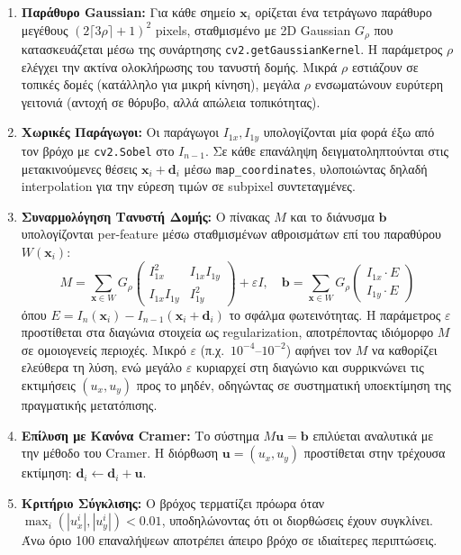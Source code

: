 \documentclass[12pt]{article}
\begin{document}
\begin{enumerate}
    \item \textbf{Παράθυρο Gaussian:} Για κάθε σημείο $\mathbf{x}_i$ ορίζεται ένα τετράγωνο παράθυρο μεγέθους $(2\lceil 3\rho \rceil + 1)^2$ pixels, σταθμισμένο με 2D Gaussian $G_\rho$ που κατασκευάζεται μέσω της συνάρτησης \texttt{cv2.getGaussianKernel}. Η παράμετρος $\rho$ ελέγχει την ακτίνα ολοκλήρωσης του τανυστή δομής. Μικρά $\rho$ εστιάζουν σε τοπικές δομές (κατάλληλο για μικρή κίνηση), μεγάλα $\rho$ ενσωματώνουν ευρύτερη γειτονιά (αντοχή σε θόρυβο, αλλά απώλεια τοπικότητας).

    \item \textbf{Χωρικές Παράγωγοι:} Οι παράγωγοι $I_{1x}, I_{1y}$ υπολογίζονται μία φορά έξω από τον βρόχο με \texttt{cv2.Sobel} στο $I_{n-1}$. Σε κάθε επανάληψη δειγματοληπτούνται στις μετακινούμενες θέσεις $\mathbf{x}_i + \mathbf{d}_i$ μέσω \texttt{map\_coordinates}, υλοποιώντας δηλαδή interpolation για την εύρεση τιμών σε subpixel συντεταγμένες.

    \item \textbf{Συναρμολόγηση Τανυστή Δομής:} Ο πίνακας $M$ και το διάνυσμα $\mathbf{b}$ υπολογίζονται per-feature μέσω σταθμισμένων αθροισμάτων επί του παραθύρου $W(\mathbf{x}_i)$:
    \[
    M = \sum_{\mathbf{x} \in W} G_\rho \begin{pmatrix} I_{1x}^2 & I_{1x}I_{1y} \\ I_{1x}I_{1y} & I_{1y}^2 \end{pmatrix} + \varepsilon I, \quad
    \mathbf{b} = \sum_{\mathbf{x} \in W} G_\rho \begin{pmatrix} I_{1x} \cdot E \\ I_{1y} \cdot E \end{pmatrix}
    \]
    όπου $E = I_n(\mathbf{x}_i) - I_{n-1}(\mathbf{x}_i + \mathbf{d}_i)$ το σφάλμα φωτεινότητας. Η παράμετρος $\varepsilon$ προστίθεται στα διαγώνια στοιχεία ως regularization, αποτρέποντας ιδιόμορφο $M$ σε ομοιογενείς περιοχές. Μικρό $\varepsilon$ (π.χ.\ $10^{-4}$--$10^{-2}$) αφήνει τον $M$ να καθορίζει ελεύθερα τη λύση, ενώ μεγάλο $\varepsilon$ κυριαρχεί στη διαγώνιο και συρρικνώνει τις εκτιμήσεις $(u_x, u_y)$ προς το μηδέν, οδηγώντας σε συστηματική υποεκτίμηση της πραγματικής μετατόπισης.

    \item \textbf{Επίλυση με Κανόνα Cramer:} Το σύστημα $M\mathbf{u} = \mathbf{b}$ επιλύεται αναλυτικά με την μέθοδο του Cramer. Η διόρθωση $\mathbf{u} = (u_x, u_y)$ προστίθεται στην τρέχουσα εκτίμηση: $\mathbf{d}_i \leftarrow \mathbf{d}_i + \mathbf{u}$.

    \item \textbf{Κριτήριο Σύγκλισης:} Ο βρόχος τερματίζει πρόωρα όταν $\max_i(|u_x^i|, |u_y^i|) < 0.01$, υποδηλώνοντας ότι οι διορθώσεις έχουν συγκλίνει. Άνω όριο 100 επαναλήψεων αποτρέπει άπειρο βρόχο σε ιδιαίτερες περιπτώσεις.
\end{enumerate}
\end{document}

